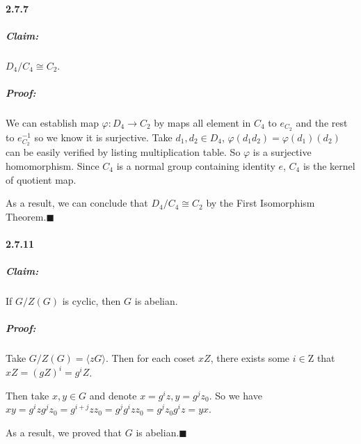 \documentclass[11pt]{article}
\begin{document}
		
	\paragraph{2.7.7}
		\subparagraph{Claim:} $D_4 / C_4 \cong C_2$.
		
		\subparagraph{Proof:} We can establish map $\varphi: D_4 \rightarrow C_2$ by maps all element in $C_4$ to $e_{C_2}$ and the rest to $e_{C_2}^{-1}$ so we know it is surjective. Take $d_1, d_2 \in D_4$, $\varphi(d_1d_2) = \varphi(d_1)(d_2)$ can be easily verified by listing multiplication table. So $\varphi$ is a surjective homomorphism. Since $C_4$ is a normal group containing identity $e$, $C_4$ is the kernel of quotient map.
		
		As a result, we can conclude that $D_4 / C_4 \cong C_2$ by the First Isomorphism Theorem.$\blacksquare$
	\paragraph{2.7.11}
		\subparagraph{Claim:} If $G / Z(G)$ is cyclic, then $G$ is abelian.
		
		\subparagraph{Proof:} Take $G / Z(G) = \langle zG \rangle$. Then for each coset $xZ$, there exists some $i \in \mathrm{Z}$ that $xZ = (gZ)^i = g^iZ$.
		
		Then take $x, y \in G$ and denote $x = g^iz, y = g^jz_0$. So we have $xy = g^izg^jz_0 = g^{i + j}zz_0 = g^jg^izz_0 = g^jz_0g^iz = yx$.
		
		As a result, we proved that $G$ is abelian.$\blacksquare$
\end{document}

